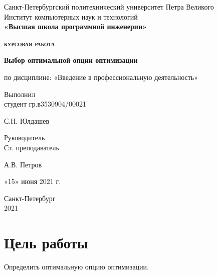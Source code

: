 \documentclass{article}
\begin{document}
\thispagestyle{empty}	%

\begin{center}
	Санкт-Петербургский политехнический университет Петра Великого\\
	Институт компьютерных наук и технологий\\
	\bfseries{«Высшая школа программной инженерии»}
\end{center}

\vspace{20ex} %

\begin{center}
	\begin{huge} {\bfseries{\scshape курсовая работа}} \end{huge}

	\vspace{3ex}

	{\bfseries Выбор оптимальной опции оптимизации}

	по дисциплине: «Введение в профессиональную деятельность»
\end{center}

\vspace{30ex}

\noindent Выполнил\\
студент гр.в3530904/00021\hfill \begin{minipage}{0.6\textwidth} \hfill С.Н. Юлдашев\end{minipage}

\vspace{3ex}

\noindent Руководитель\\
Ст. преподаватель\hfill \begin{minipage} {0.6\textwidth}\hfill А.В. Петров\end{minipage}

\vspace{3ex}

\hfill \begin{minipage}{0.6\textwidth} \hfill «15» июня 2021 г.\end{minipage}

\vfill

\begin{center}
	Санкт-Петербург\\ 
	2021
\end{center}

\newpage
\tableofcontents
\newpage
\section{Цель работы}
  Определить оптимальную опцию оптимизации.
\end{document}
